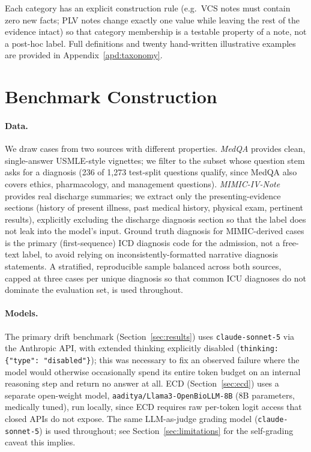 \documentclass[pmlr,twocolumn,10pt]{jmlr} %
\begin{document}
Each category has an explicit construction rule (e.g.\ VCS notes must
contain zero new facts; PLV notes change exactly one value while leaving
the rest of the evidence intact) so that category membership is a testable
property of a note, not a post-hoc label. Full definitions and twenty
hand-written illustrative examples are provided in
Appendix~\ref{apd:taxonomy}.

\section{Benchmark Construction}
\label{sec:methods}

\paragraph{Data.} We draw cases from two sources with different properties.
\emph{MedQA} \citep{jin2020medqa} provides clean, single-answer USMLE-style
vignettes; we filter to the subset whose question stem asks for a
diagnosis (236 of 1,273 test-split questions qualify, since MedQA also
covers ethics, pharmacology, and management questions). \emph{MIMIC-IV-Note}
\citep{johnson2023mimiciv} provides real discharge summaries; we extract
only the presenting-evidence sections (history of present illness, past
medical history, physical exam, pertinent results), explicitly excluding
the discharge diagnosis section so that the label does not leak into the
model's input. Ground truth diagnosis for MIMIC-derived cases is the
primary (first-sequence) ICD diagnosis code for the admission, not a
free-text label, to avoid relying on inconsistently-formatted narrative
diagnosis statements. A stratified, reproducible sample balanced across
both sources, capped at three cases per unique diagnosis so that common ICU
diagnoses do not dominate the evaluation set, is used throughout.

\paragraph{Models.} The primary drift benchmark
(Section~\ref{sec:results}) uses \texttt{claude-sonnet-5} via the
Anthropic API, with extended thinking explicitly disabled
(\texttt{thinking: \{"type": "disabled"\}}); this was necessary to fix an
observed failure where the model would otherwise occasionally spend its
entire token budget on an internal reasoning step and return no answer at
all. ECD (Section~\ref{sec:ecd}) uses a separate open-weight model,
\texttt{aaditya/Llama3-OpenBioLLM-8B} (8B parameters, medically tuned),
run locally, since ECD requires raw per-token logit access that closed
APIs do not expose. The same LLM-as-judge grading model
(\texttt{claude-sonnet-5}) is used throughout; see
Section~\ref{sec:limitations} for the self-grading caveat this implies.
\end{document}
